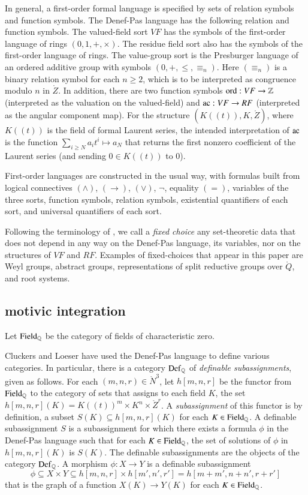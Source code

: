 In general, a first-order formal language is specified by sets of relation symbols and function symbols.
The Denef-Pas language has the following relation and function symbols.  
The valued-field sort $VF$ has the symbols of the first-order language of rings $(0,1,+,\times)$.  
The residue field sort also has the symbols of the first-order language of rings.  
The value-group sort is the Presburger language of an ordered additive group with symbols $(0,+,\le,\equiv_n)$.  
Here $(\equiv_n)$ is a binary relation symbol for each $n\ge 2$, which is to be interpreted as congruence modulo $n$ in $\ring{Z}$.
In addition, there are two function symbols ${\operatorname{ord}}:VF\to\mathbb{Z}$ (interpreted as the valuation on the valued-field) and ${\operatorname{ac}}:VF\to RF$ 
(interpreted as the angular component map).  
For the structure $(K((t)),K,\ring{Z})$, where $K((t))$ is the field of formal Laurent series, 
the intended interpretation of ${\operatorname{ac}}$ 
is the function $\sum_{i\ge N} a_i t^i\mapsto a_N$ 
that returns the first nonzero coefficient of the Laurent series (and sending $0\in K((t))$ to $0$).

First-order languages are constructed in the usual way, with formulas built from logical connectives $(\land)$, $(\to)$, $(\lor)$, $\neg$, equality
$(=)$, variables of the three sorts, function symbols, relation symbols, existential quantifiers of each sort, and universal quantifiers of each sort.


Following the terminology of \cite{gordon}, we call  a {\it fixed choice} any set-theoretic data that does not depend in any way on the Denef-Pas
language, its variables, nor on the structures of $VF$ and $RF$.   Examples of fixed-choices that appear in this paper are Weyl groups, abstract groups,
representations of split reductive groups over $\ring{Q}$, and root systems.

\subsection{motivic integration}


Let ${\operatorname{Field}}_{\mathbb{Q}}$ be the category of fields of characteristic zero.  

Cluckers and Loeser have used the Denef-Pas language to define various categories.  In particular, there
is a category  ${\operatorname{Def}}_{\mathbb{Q}}$ of {\it definable subassignments}, given as follows.
For each $(m,n,r)\in\ring{N}^3$, let $h[m,n,r]$ be the functor from ${\operatorname{Field}}_{\mathbb{Q}}$ to the category of sets that assigns
to each field $K$, the set $h[m,n,r](K)=K((t))^m\times K^n\times \ring{Z}^r$.  A {\it subassignment} of this functor is by
definition, a subset $S(K) \subseteq h[m,n,r](K)$ for each $K\in{\operatorname{Field}}_{\mathbb{Q}}$.  
A definable subassignment $S$ is  a subassignment for which there exists a formula $\phi$ in the Denef-Pas language such that for each $K\in{\operatorname{Field}}_{\mathbb{Q}}$, 
the set of solutions of $\phi$ in $h[m,n,r](K)$ is $S(K)$.
The definable subassignments are the objects of the category ${\operatorname{Def}}_{\mathbb{Q}}$.  
A morphism $\phi:X\to Y$ is a definable subassignment 
\[
\phi\subseteq X\times Y\subseteq h[m,n,r]\times h[m',n',r'] = h[m+m',n+n',r+r']
\]
that is the graph of a function $X(K)\to Y(K)$ for each $K\in {\operatorname{Field}}_{\mathbb{Q}}$.

